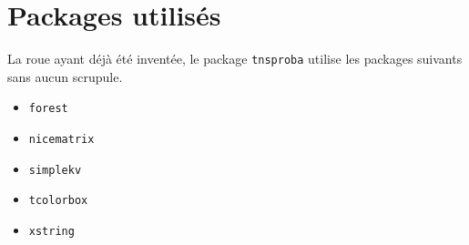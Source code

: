 \documentclass[12pt,a4paper]{article}
\begin{document}
\section{Packages utilisés}

La roue ayant déjà été inventée, le package \verb#tnsproba# utilise les packages suivants sans aucun scrupule.

\begin{multicols}{4}
    \begin{itemize}
        \item \verb#forest#
        \item \verb#nicematrix#
        \item \verb#simplekv#
        \item \verb#tcolorbox#
        \item \verb#xstring#
    \end{itemize}
\end{multicols}
\end{document}
